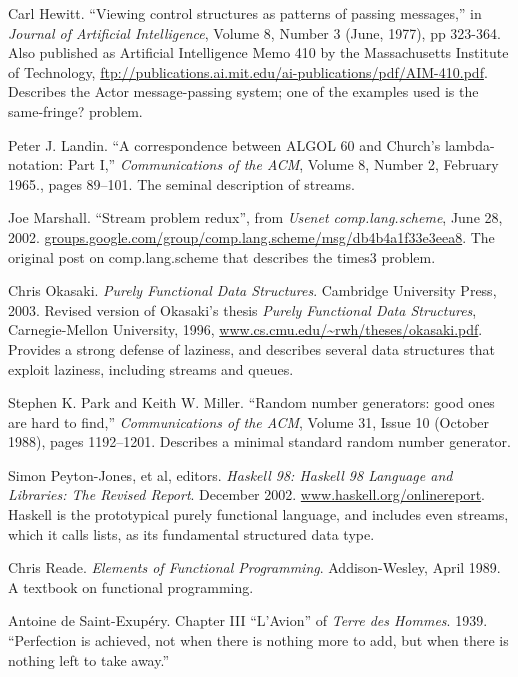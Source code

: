 Carl Hewitt. ``Viewing control structures as patterns of passing
messages,'' in \emph{Journal of Artificial Intelligence}, Volume 8,
Number 3 (June, 1977), pp 323-364. Also published as Artificial
Intelligence Memo 410 by the Massachusetts Institute of Technology,
\url{ftp://publications.ai.mit.edu/ai-publications/pdf/AIM-410.pdf}.
Describes the Actor message-passing system; one of the examples used is
the same-fringe? problem.

Peter J. Landin. ``A correspondence between ALGOL 60 and Church's
lambda-notation: Part I,'' \emph{Communications of the ACM}, Volume 8,
Number 2, February 1965., pages 89--101. The seminal description of
streams.

Joe Marshall. ``Stream problem redux'', from \emph{Usenet
comp.lang.scheme}, June 28, 2002.
\href{http://groups.google.com/group/comp.lang.scheme/msg/db4b4a1f33e3eea8}{groups.google.com/group/comp.lang.scheme/msg/db4b4a1f33e3eea8}.
The original post on comp.lang.scheme that describes the times3 problem.

Chris Okasaki. \emph{Purely Functional Data Structures}. Cambridge
University Press, 2003. Revised version of Okasaki's thesis \emph{Purely
Functional Data Structures}, Carnegie-Mellon University, 1996,
\href{http://www.cs.cmu.edu/~rwh/theses/okasaki.pdf}{www.cs.cmu.edu/\textasciitilde{}rwh/theses/okasaki.pdf}.
Provides a strong defense of laziness, and describes several data
structures that exploit laziness, including streams and queues.

Stephen K. Park and Keith W. Miller. ``Random number generators: good
ones are hard to find,'' \emph{Communications of the ACM}, Volume 31,
Issue 10 (October 1988), pages 1192--1201. Describes a minimal standard
random number generator.

Simon Peyton-Jones, et al, editors. \emph{Haskell 98: Haskell 98
Language and Libraries: The Revised Report}. December 2002.
\href{http://www.haskell.org/onlinereport}{www.haskell.org/onlinereport}.
Haskell is the prototypical purely functional language, and includes
even streams, which it calls lists, as its fundamental structured data
type.

Chris Reade. \emph{Elements of Functional Programming}. Addison-Wesley,
April 1989. A textbook on functional programming.

Antoine de Saint-Exupéry. Chapter III ``L'Avion'' of \emph{Terre des
Hommes}. 1939. ``Perfection is achieved, not when there is nothing more
to add, but when there is nothing left to take away.''

